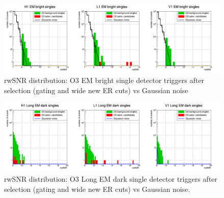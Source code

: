 
\begin{figure}
  \centering
  \includegraphics[width=\linewidth]{sectionSelection/plotsNewER/cPosterBright_allCut_newER.png}
  \caption{rwSNR distribution: O3 EM bright single detector triggers after selection (gating and wide new ER cuts) vs Gaussian noise}
  \label{fig:newER_gaus_bright}
\end{figure}
% 
\begin{figure}
  \centering
  \includegraphics[width=\linewidth]{sectionSelection/plotsNewER/cPosterDarkLong_allCut_newER.png}
  \caption{rwSNR distribution: O3 Long EM dark single detector triggers after selection (gating and wide new ER cuts) vs Gaussian noise.}
  \label{fig:newER_gaus_darkLong}
\end{figure}
% 
% 





